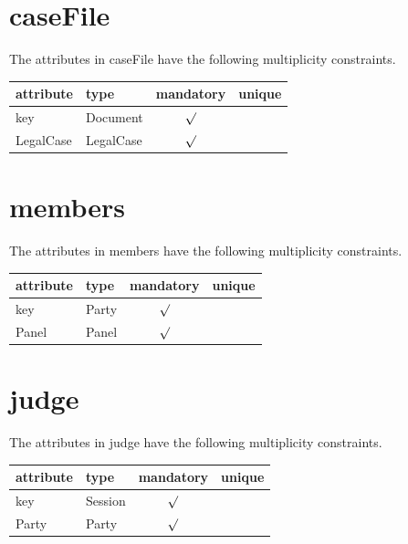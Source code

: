 \documentclass[10pt,a4paper]{report}              %
\theoremstyle{plain}\theorembodyfont{\rmfamily}\newtheorem{definition}{Definition}[section]
\theoremstyle{plain}\theorembodyfont{\rmfamily}\newtheorem{designrule}[definition]{Requirement}
\begin{document}
\section{caseFile}

\label{sct:plug caseFile}

The attributes in caseFile have the following multiplicity constraints. 

\begin{center}
\begin{tabular}{llcc}
attribute & type & mandatory & unique\\
\hline
key  & Document & $\surd$ & \\
LegalCase & LegalCase & $\surd$ & \\
\end{tabular}
\end{center}

\section{members}

\label{sct:plug members}

The attributes in members have the following multiplicity constraints. 

\begin{center}
\begin{tabular}{llcc}
attribute & type & mandatory & unique\\
\hline
key  & Party & $\surd$ & \\
Panel & Panel & $\surd$ & \\
\end{tabular}
\end{center}

\section{judge}

\label{sct:plug judge}

The attributes in judge have the following multiplicity constraints. 

\begin{center}
\begin{tabular}{llcc}
attribute & type & mandatory & unique\\
\hline
key  & Session & $\surd$ & \\
Party & Party & $\surd$ & \\
\end{tabular}
\end{center}
\end{document}
